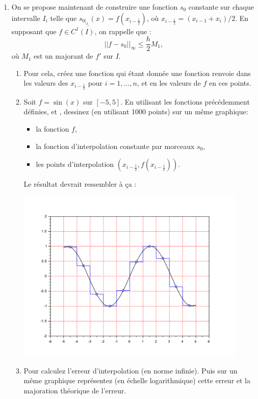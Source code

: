 \documentclass[a4paper,12pt,reqno]{amsart}
\begin{document}
\begin{exo}
\begin{enumerate}
    \item On se propose maintenant de construire une fonction $s_0$ constante sur chaque intervalle $I_i$ telle que $s_{0|_{I_i}}(x)=f(x_{i-\frac12})$, où $x_{i-\frac12}=(x_{i-1}+x_{i})/2$. En supposant que  $f \in C^1(I)$, on rappelle que :
      \[
        ||f-s_0||_{\infty}\leq \frac{h}{2} M_1,
      \]
    où $M_1$ est un majorant de $f'$ sur $I$.
    \begin{enumerate}
      \item Pour cela, créez une fonction  qui étant donnée une fonction  renvoie dans  les valeurs des $x_{i-\frac12}$ pour $i=1,\ldots,n$, et en  les valeurs de $f$ en ces points.

      \item Soit $f=\sin(x)$ sur $[-5,5]$. En utilisant les fonctions précédemment définies,  et , dessinez (en utilisant 1000 points) sur un même graphique:
      \begin{itemize}
        \item la fonction $f$,
        \item la fonction d'interpolation constante par morceaux $s_{0}$,
        \item les points d'interpolation $(x_{i-\frac12},f(x_{i-\frac12}))$.
      \end{itemize}
      Le résultat devrait ressembler à ça :
      \begin{center}
        \includegraphics[width=11cm]{SciLab_test_interp_constante}
      \end{center}

      \item Pour  calculez l'erreur d'interpolation (en norme infinie). Puis sur un même graphique représentez (en échelle logarithmique) cette erreur et la majoration théorique de l'erreur.
    \end{enumerate}
  \end{enumerate}
\end{exo}
\end{document}
